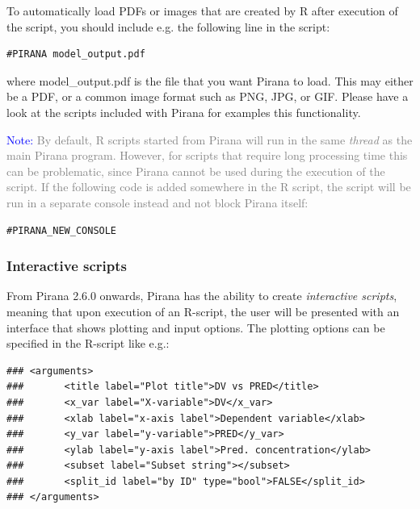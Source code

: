 {{{{\vspace{15pt} \noindent To automatically load PDFs or images that are created by
R after execution of the script, you should include e.g. the following line in
the script:

\begin{lstlisting}
#PIRANA model_output.pdf
\end{lstlisting}

\noindent where model\_output.pdf is the file that you want Pirana
to load. This may either be a PDF, or a common image format such as
PNG, JPG, or GIF. Please have a look at the scripts included with
Pirana for examples this
functionality.

\vspace{10pt}
\noindent\scriptsize \textcolor{Blue}{Note:} \textcolor{Grey} {
By default, R scripts started from Pirana will run in the same \textit{thread} as the main Pirana program. However,
for scripts that require long processing time this can be problematic, since Pirana cannot be used during
the execution of the script. If the following code is added somewhere in the R script, the script
will be run in a separate console instead and not block Pirana itself:}

\begin{lstlisting}
#PIRANA_NEW_CONSOLE
\end{lstlisting}

\normalsize

\subsubsection*{Interactive scripts}
From Pirana 2.6.0 onwards, Pirana has the ability to create
\textit{interactive scripts}, meaning that upon execution of an
R-script, the user will be presented with an
interface that shows plotting and input options. The plotting options can be
specified in the R-script like e.g.:

\begin{lstlisting}
### <arguments>
###       <title label="Plot title">DV vs PRED</title>
###       <x_var label="X-variable">DV</x_var>
###       <xlab label="x-axis label">Dependent variable</xlab>
###       <y_var label="y-variable">PRED</y_var>
###       <ylab label="y-axis label">Pred. concentration</ylab>
###       <subset label="Subset string"></subset>
###       <split_id label="by ID" type="bool">FALSE</split_id>
### </arguments>
\end{lstlisting}

}}}}
